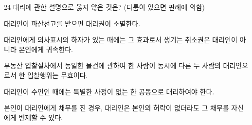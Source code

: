\begin{question}{24}
대리에 관한 설명으로 옳지 않은 것은? (다툼이 있으면 판례에 의함)
\begin{choices}
  \item 대리인이 파산선고를 받으면 대리권이 소멸한다.
  \item 대리인에게 의사표시의 하자가 있는 때에는 그 효과로서 생기는 취소권은 대리인이 아니라 본인에게 귀속한다.
  \item 부동산 입찰절차에서 동일한 물건에 관하여 한 사람이 동시에 다른 두 사람의 대리인으로서 한 입찰행위는 무효이다.
  \item 대리인이 수인인 때에는 특별한 사정이 없는 한 공동으로 대리하여야 한다.
  \item 본인이 대리인에게 채무를 진 경우, 대리인은 본인의 허락이 없더라도 그 채무를 자신에게 변제할 수 있다.
\end{choices}
\end{question}
